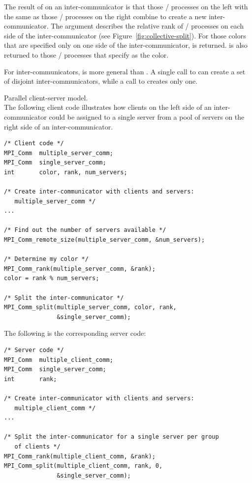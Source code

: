 \noindent The result of  on an inter-communicator is that those
\MPI/ processes on the left with the same  as those \MPI/ processes on
the right combine to create a new inter-communicator. The 
argument describes the relative rank of \MPI/ processes on each side of the
inter-communicator (see Figure~\ref{fig:collective-split}). For those colors
that are specified only on one side of the inter-communicator,
 is returned. 
is also returned to those \MPI/ processes that specify 
as the color.
\begin{users}
For inter-communicators,  is more general than .
A single call to  can create a set of disjoint inter-communicators,
while a call to  creates only one.
\end{users}

\begin{example}
\label{ex:para-client-server}
%
%
Parallel client-server model.\\
The following client code illustrates how clients on the left side of an
inter-communicator could be assigned to a single server from a pool of
servers on the right side of an inter-communicator.
\begin{lstlisting}[language={[MPI]C}]
/* Client code */
MPI_Comm  multiple_server_comm;
MPI_Comm  single_server_comm;
int       color, rank, num_servers;

/* Create inter-communicator with clients and servers:
   multiple_server_comm */
...

/* Find out the number of servers available */
MPI_Comm_remote_size(multiple_server_comm, &num_servers);

/* Determine my color */
MPI_Comm_rank(multiple_server_comm, &rank);
color = rank % num_servers;

/* Split the inter-communicator */
MPI_Comm_split(multiple_server_comm, color, rank,
               &single_server_comm);
\end{lstlisting}
\noindent The following is the corresponding server code:
\begin{lstlisting}[language={[MPI]C}]
/* Server code */
MPI_Comm  multiple_client_comm;
MPI_Comm  single_server_comm;
int       rank;

/* Create inter-communicator with clients and servers:
   multiple_client_comm */
...

/* Split the inter-communicator for a single server per group
   of clients */
MPI_Comm_rank(multiple_client_comm, &rank);
MPI_Comm_split(multiple_client_comm, rank, 0,
               &single_server_comm);
\end{lstlisting}
\end{example}

